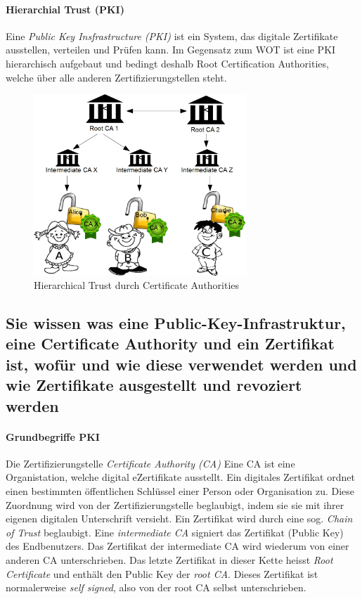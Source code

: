 \documentclass[10pt,a4paper]{article}
\begin{document}
\paragraph*{Hierarchial Trust (PKI)}Eine \textsl{Public Key Insfrastructure (PKI)} ist ein System, das digitale Zertifikate ausstellen, verteilen und Prüfen kann. Im Gegensatz zum WOT ist eine PKI hierarchisch aufgebaut und bedingt deshalb Root Certification Authorities, welche über alle anderen Zertifizierungstellen steht.
\begin{figure}[H]
    \begin{center}
    \includegraphics[width=8cm]{images/ht.png}
    \caption{Hierarchical Trust durch Certificate Authorities}
    \label{ht}
    \end{center}
\end{figure}


\subsection*{Sie wissen was eine Public-Key-Infrastruktur, eine Certificate Authority und ein Zertifikat ist, wofür und wie diese verwendet werden und wie Zertifikate ausgestellt und revoziert werden}

\paragraph*{Grundbegriffe PKI}Die Zertifizierungstelle \textsl{Certificate Authority (CA)}\newline
Eine CA ist eine Organistation, welche digital eZertifikate ausstellt. Ein digitales Zertifikat ordnet einen bestimmten öffentlichen Schlüssel einer Person oder Organisation zu. Diese Zuordnung wird von der Zertifizierungstelle beglaubigt, indem sie sie mit ihrer eigenen digitalen Unterschrift versieht.\newline
Ein Zertifikat wird durch eine sog. \textsl{Chain of Trust} beglaubigt. Eine \textsl{intermediate CA} signiert das Zertifikat (Public Key) des Endbenutzers. Das Zertifikat der intermediate CA wird wiederum von einer anderen CA unterschrieben. Das letzte Zertifikat in dieser Kette heisst \textsl{Root Certificate} und enthält den Public Key der \textsl{root CA}. Dieses Zertifikat ist normalerweise \textsl{self signed}, also von der root CA selbst unterschrieben.
\end{document}
